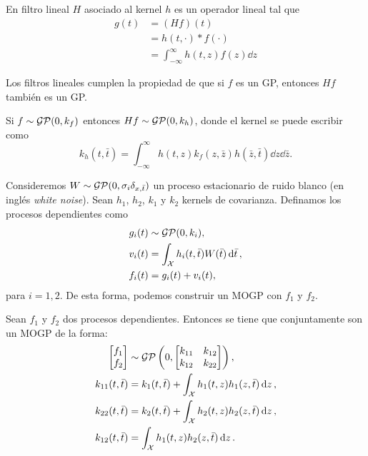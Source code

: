 \begin{definition}
	En filtro lineal \(H\) asociado al kernel \(h\) es un operador lineal tal que
	\begin{align*}
		g(t)	&= (Hf)(t)\\
				&= h(t, \cdot) \ast f(\cdot) \\
				&= \int_{-\infty}^{\infty} h(t, z) f(z) \dd{z}
	\end{align*}
\end{definition}

Los filtros lineales cumplen la propiedad de que si \(f\) es un GP, entonces \(Hf\) también es un GP.

\begin{proposition}
	Si \(f \sim \operatorname{\mathcal{GP}} (0, k_{f})\) entonces \(Hf \sim \operatorname{\mathcal{GP}}(0, k_{h})\), donde el kernel se puede escribir como
	\begin{equation*}
		k_{h}(t, \bar{t}) = \int_{-\infty}^{\infty} h(t, z) k_{f}(z, \bar{z}) h(\bar{z}, \bar{t}) \dd{z} \dd{\bar{z}}.
	\end{equation*}
\end{proposition}

Consideremos \(W \sim \operatorname{\mathcal{GP}} (0, \sigma_{i} \delta_{x, \bar{t}})\) un proceso estacionario de ruido blanco (en inglés \emph{white noise}). Sean \(h_{1}\), \(h_{2}\), \(k_{1}\) y \(k_{2}\) kernels de covarianza. Definamos los procesos dependientes como
\begin{align*}
	g_{i}(t)	&\sim \operatorname{\mathcal{GP}}(0, k_{i}), \\
	v_{i}(t)	&= \int_{\mathcal{X}} h_{i}(t, \bar{t}) W(\bar{t}) \dd{\bar{t}}, \\
	f_{i}(t)	&= g_{i}(t) + v_{i}(t),
\end{align*}%
para \(i = 1,2\). De esta forma, podemos construir un MOGP con \(f_{1}\) y \(f_{2}\).

\begin{proposition}
	Sean \(f_{1}\) y \(f_{2}\) dos procesos dependientes. Entonces se tiene que conjuntamente son un MOGP de la forma:
	\begin{align*}
		\begin{bmatrix} f_{1} \\ f_{2} \end{bmatrix}	&\sim \operatorname{\mathcal{GP}}\left(0, \begin{bmatrix} k_{11} & k_{12} \\ k_{12} & k_{22} \end{bmatrix}\right), \\
		k_{11}(t, \bar{t})								&= k_{1}(t, \bar{t}) + \int_{\mathcal{X}} h_{1}(t, z) h_{1}(z, \bar{t}) \dd{z}, \\
		k_{22}(t, \bar{t})								&= k_{2}(t, \bar{t}) + \int_{\mathcal{X}} h_{2}(t, z) h_{2}(z, \bar{t}) \dd{z}, \\
		k_{12}(t, \bar{t})								&= \int_{\mathcal{X}} h_{1}(t, z) h_{2}(z, \bar{t}) \dd{z}.
	\end{align*}
\end{proposition}

